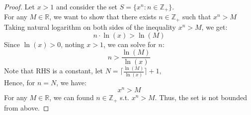 \documentclass{article}
\begin{document}
\begin{proof}
    Let $x > 1$ and consider the set $S = \{ x^n : n \in \mathbb{Z}_{+} \}$.
    \\
    For any $M \in \mathbb{R}$, we want to show that there exists $n \in \mathbb{Z}_{+}$ such that $x^n > M$
    \\
    Taking natural logarithm on both sides of the inequality $x^n > M$, we get:
    \[ n \cdot \ln(x) > \ln(M) \]
    Since $\ln(x) > 0$, noting $x > 1$, we can solve for $n$:
    \[ n > \frac{\ln(M)}{\ln(x)} \]
    Note that RHS is a constant, let $N = \lceil \frac{\ln(M)}{\ln(x)} \rceil + 1$,
    \\
    Hence, for $n = N$, we have:
    \[ x^n > M \]
    For any $M \in \mathbb{R}$, we can found $n \in \mathbb{Z}_{+}$ s.t. $x^n > M$. Thus, the set is not bounded from above.
\end{proof}
\end{document}
